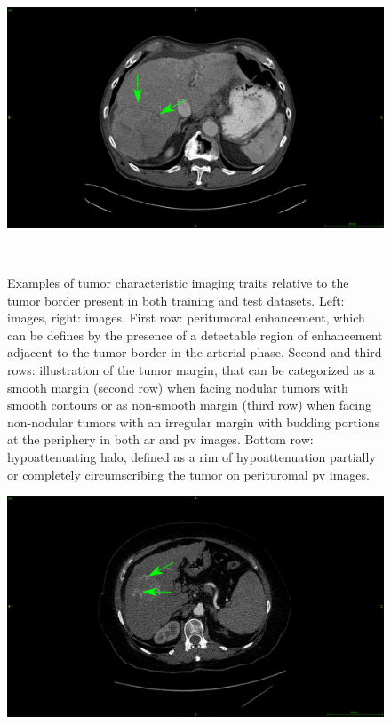 {\begin{figure}[!ht]
\begin{mdframed}[backgroundcolor=blue!50,linecolor=blue!50]
\begin{minipage}{0.45\linewidth}
		\end{minipage} \hspace{-0.1cm}
		\begin{minipage}{0.45\linewidth}
			\includegraphics[width=\linewidth]{images/ImagingTraits/TCIA_halo}
		\end{minipage} \\
	\end{mdframed}
	\caption{Examples of tumor characteristic imaging traits relative to the tumor border present in both training and test datasets. Left: \textbf{} images, right: \textbf{} images. First row: peritumoral enhancement, which can be defines by the presence of a detectable region of enhancement adjacent to the tumor border in the arterial phase. Second and third rows: illustration of the tumor margin, that can be categorized as a smooth margin (second row) when facing nodular tumors with smooth contours or as non-smooth margin (third row) when facing non-nodular tumors with an irregular margin with budding portions at the periphery in both \ac{ar} and \ac{pv} images. Bottom row: hypoattenuating halo, defined as a rim of hypoattenuation partially or completely circumscribing the tumor on perituromal \ac{pv} images. }
	\label{fig:InterDb_imagingTraits}
\end{figure}
\begin{figure}[!ht]
	\begin{mdframed}[backgroundcolor=blue!50,linecolor=blue!50]
		\centering
		\begin{minipage}{0.45\linewidth}
			\includegraphics[width=\linewidth]{images/ImagingTraits/GDB_internalArteries}

\end{minipage}
\end{mdframed}
\end{figure}}
